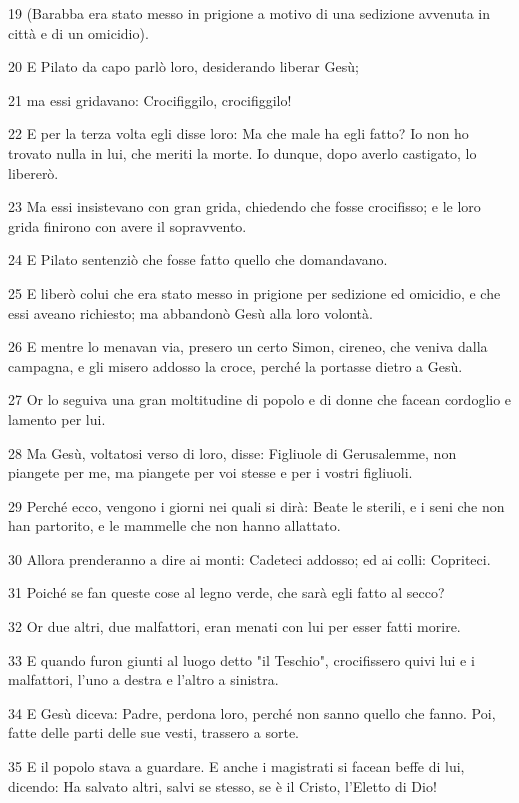 \par 19 (Barabba era stato messo in prigione a motivo di una sedizione avvenuta in città e di un omicidio).
\par 20 E Pilato da capo parlò loro, desiderando liberar Gesù;
\par 21 ma essi gridavano: Crocifiggilo, crocifiggilo!
\par 22 E per la terza volta egli disse loro: Ma che male ha egli fatto? Io non ho trovato nulla in lui, che meriti la morte. Io dunque, dopo averlo castigato, lo libererò.
\par 23 Ma essi insistevano con gran grida, chiedendo che fosse crocifisso; e le loro grida finirono con avere il sopravvento.
\par 24 E Pilato sentenziò che fosse fatto quello che domandavano.
\par 25 E liberò colui che era stato messo in prigione per sedizione ed omicidio, e che essi aveano richiesto; ma abbandonò Gesù alla loro volontà.
\par 26 E mentre lo menavan via, presero un certo Simon, cireneo, che veniva dalla campagna, e gli misero addosso la croce, perché la portasse dietro a Gesù.
\par 27 Or lo seguiva una gran moltitudine di popolo e di donne che facean cordoglio e lamento per lui.
\par 28 Ma Gesù, voltatosi verso di loro, disse: Figliuole di Gerusalemme, non piangete per me, ma piangete per voi stesse e per i vostri figliuoli.
\par 29 Perché ecco, vengono i giorni nei quali si dirà: Beate le sterili, e i seni che non han partorito, e le mammelle che non hanno allattato.
\par 30 Allora prenderanno a dire ai monti: Cadeteci addosso; ed ai colli: Copriteci.
\par 31 Poiché se fan queste cose al legno verde, che sarà egli fatto al secco?
\par 32 Or due altri, due malfattori, eran menati con lui per esser fatti morire.
\par 33 E quando furon giunti al luogo detto "il Teschio", crocifissero quivi lui e i malfattori, l'uno a destra e l'altro a sinistra.
\par 34 E Gesù diceva: Padre, perdona loro, perché non sanno quello che fanno. Poi, fatte delle parti delle sue vesti, trassero a sorte.
\par 35 E il popolo stava a guardare. E anche i magistrati si facean beffe di lui, dicendo: Ha salvato altri, salvi se stesso, se è il Cristo, l'Eletto di Dio!
